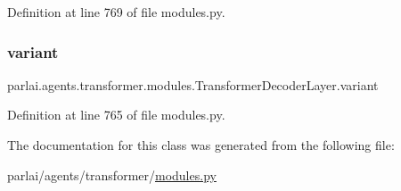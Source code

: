 Definition at line 769 of file modules.\+py.

\mbox{\label{classparlai_1_1agents_1_1transformer_1_1modules_1_1TransformerDecoderLayer_a94a9a714a2585fd6a675a08643e3ce6b}} 
\subsubsection{\texorpdfstring{variant}{variant}}
{\footnotesize\ttfamily parlai.\+agents.\+transformer.\+modules.\+Transformer\+Decoder\+Layer.\+variant}



Definition at line 765 of file modules.\+py.



The documentation for this class was generated from the following file\+:\begin{DoxyCompactItemize}
\item 
parlai/agents/transformer/\hyperlink{parlai_2agents_2transformer_2modules_8py}{modules.\+py}\end{DoxyCompactItemize}
